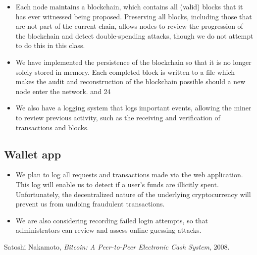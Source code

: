 \documentclass[a4paper,12pt]{article}
\begin{document}
\begin{itemize}
	\item Each node maintains a blockchain, which contains all (valid) blocks that it has ever witnessed being proposed.
	Preserving all blocks, including those that are not part of the current chain, allows nodes to review the progression of the blockchain and detect double-spending attacks, though we do not attempt to do this in this class.
	\begin{comment}
	\item Miners heavily audit the work of other miners in order to maintain the integrity of the blockchain.
	\item For each block a miner receives (or broadcasts), its hash will be checked to see if it satisfies a set difficulty.
	\item Every transaction inside of the block is verified by checking that each input has a corresponding unspent output (UTXO), that the signature for each input was signed with the private key corresponding to the public key on the previous UTXO, and that the sum of the input amounts (from the UTXO's) is equal to the sum of the outputs.
	\item If either of these checks fail, the potential new block will be rejected.
	\item So long as an adversary does not control a majority of nodes in the network, blocks will not be added to the blockchain that are not correct.
	\end{comment}
	\item We have implemented the persistence of the blockchain so that it is no longer solely stored in memory.
	Each completed block is written to a file which makes the audit and reconstruction of the blockchain possible should a new node enter the network. and 24
	\item We also have a logging system that logs important events, allowing the miner to review previous activity, such as the receiving and verification of transactions and blocks. %
\end{itemize}

\subsection{Wallet app}

\begin{itemize}
	\item We plan to log all requests and transactions made via the web application.
	This log will enable us to detect if a user's funds are illicitly spent. Unfortunately, the decentralized nature of the underlying cryptocurrency will prevent us from undoing fraudulent transactions.
	\item We are also considering recording failed login attempts, so that administrators can review and assess online guessing attacks. %
\end{itemize}


\begin{thebibliography}{9}
	Satoshi Nakamoto,
	\emph{Bitcoin: A Peer-to-Peer Electronic Cash System},
	2008.
\end{thebibliography}
\end{document}

